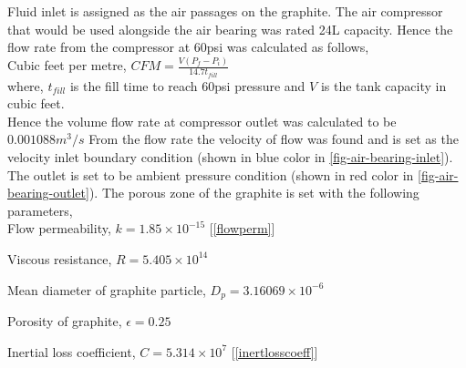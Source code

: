 \noindent Fluid inlet is assigned as the air passages on the graphite. The air compressor that would be used alongside the air bearing was rated 24L capacity. Hence the flow rate from the compressor at 60psi was calculated as follows,\\

\noindent Cubic feet per metre, $CFM = \frac{V\left(P_f - P_i\right)}{14.7t_{fill}}$\\

where, $t_{fill}$ is the fill time to reach 60psi pressure and $V$ is the tank capacity in cubic feet.\\

\noindent Hence the volume flow rate at compressor outlet was calculated to be $0.001088 m^3/s$ From the flow rate the velocity of flow was found and is set as the velocity inlet boundary condition (shown in blue color in \ref{fig-air-bearing-inlet}). The outlet is set to be ambient pressure condition (shown in red color in \ref{fig-air-bearing-outlet}). The porous zone of the graphite is set with the following parameters,\\

\noindent Flow permeability, $k = 1.85\times10^{-15}$ \hspace{160pt}[\ref{flowperm}]

\noindent Viscous resistance, $R = 5.405\times10^{14}$

\noindent Mean diameter of graphite particle, $D_p = 3.16069\times10^{-6}$

\noindent Porosity of graphite, $\epsilon = 0.25$

\noindent Inertial loss coefficient, $C = 5.314\times10^7$ \hspace{140pt}[\ref{inertlosscoeff}]


